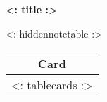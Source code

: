 \usepackage{longtable}


\begin{center}
  \textbf{<: title :>}

  \medskip

  <: hiddennotetable :>

  \bigskip

  \begin{longtable}{|c|}
    \hline
    \textbf{Card}\\\hline\endhead
    <: tablecards :>
  \end{longtable}
\end{center}



